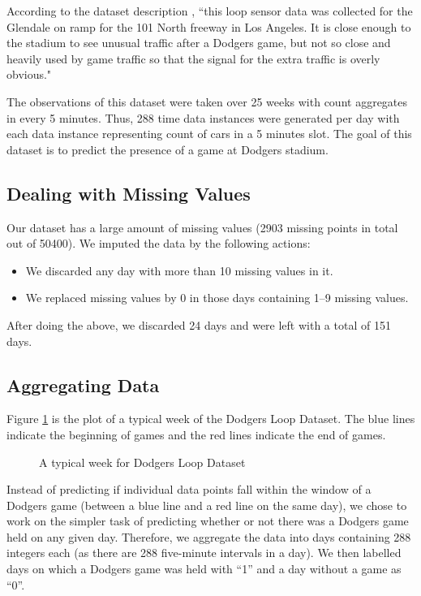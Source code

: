 \documentclass[conference]{IEEEtran}
\begin{document}
		According to the dataset description \cite{dataset}, ``this loop sensor data was collected for the Glendale on ramp for the 101 North freeway in Los Angeles. It is close enough to the stadium to see unusual traffic after a Dodgers game, but not so close and heavily used by game traffic so that the signal for the extra traffic is overly obvious." 
		
		The observations of this dataset were taken over 25 weeks with count aggregates in every 5 minutes. Thus, 288 time data instances were generated per day with each data instance representing count of cars in a 5 minutes slot. The goal of this dataset is to predict the presence of a  game at Dodgers stadium. 
		
		\subsection{Dealing with Missing Values}
		\label{sec:missing-values}
		
		Our dataset has a large amount of missing values (2903 missing points in total out of 50400). We imputed the data by the following actions:
		\begin{itemize}
			\item We discarded any day with more than 10 missing values in it.
			\item We replaced missing values by 0 in those days containing 1--9 missing values.
		\end{itemize}
		After doing the above, we discarded 24 days and were left with a total of 151 days. 
		
		\subsection{Aggregating Data}
		
		Figure \ref{fig:typical-week} is the plot of a typical week of the Dodgers Loop Dataset. The blue lines indicate the beginning of games and the red lines indicate the end of games. 
		
		\begin{figure}[H]
			\centering
			\caption{A typical week for Dodgers Loop Dataset}
			\label{fig:typical-week}
		\end{figure}
		
		Instead of predicting if individual data points fall within the window of a Dodgers game (between a blue line and a red line on the same day), we chose to work on the simpler task of predicting whether or not there was a Dodgers game held on any given day.
		Therefore, we aggregate the data into days containing 288 integers each (as there are 288 five-minute intervals in a day). We then labelled days on which a Dodgers game was held with ``1'' and a day without a game as ``0''. 
		
\end{document}
